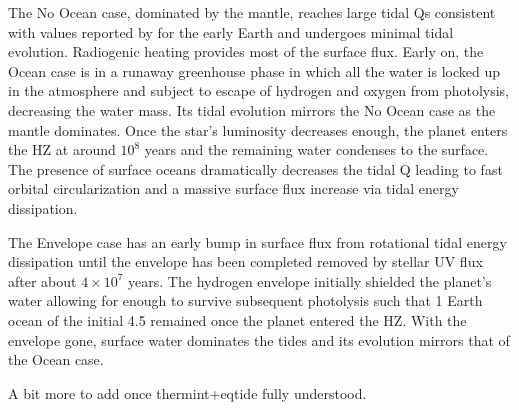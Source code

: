 \documentclass[preprint,12pt]{aastex}
\newcommand{\xxx}[1]{{\color{red} #1}} %
\begin{document}
The No Ocean case, dominated by the mantle, reaches large tidal Qs
consistent with values reported by \cite{Zahnle15} for the early Earth
and undergoes minimal tidal evolution.  Radiogenic heating provides
most of the surface flux.  Early on, the Ocean case is in a runaway
greenhouse phase in which all the water is locked up in the atmosphere
and subject to escape of hydrogen and oxygen from photolysis,
decreasing the water mass.  Its tidal evolution mirrors the No Ocean
case as the mantle dominates.  Once the star's luminosity decreases
enough, the planet enters the HZ at around $10^8$ years and the
remaining water condenses to the surface. The presence of surface
oceans dramatically decreases the tidal Q leading to fast orbital
circularization and a massive surface flux increase via tidal energy
dissipation.

The Envelope case has an early bump in surface flux from rotational
tidal energy dissipation until the envelope has been completed removed
by stellar UV flux after about $4 \times 10^7$ years.  The hydrogen
envelope initially shielded the planet's water allowing for enough to
survive subsequent photolysis such that 1 Earth ocean of the initial
4.5 remained once the planet entered the HZ.  With the envelope gone,
surface water dominates the tides and its evolution mirrors that of
the Ocean case.

\xxx{A bit more to add once thermint+eqtide fully understood.}
\end{document}
